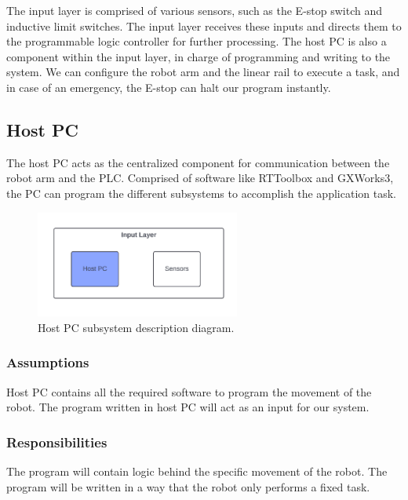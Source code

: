 The input layer is comprised of various sensors, such as the E-stop switch and inductive limit switches. The input layer receives these inputs and directs them to the programmable logic controller for further processing. The host PC is also a component within the input layer, in charge of programming and writing to the system. We can configure the robot arm and the linear rail to execute a task, and in case of an emergency, the E-stop can halt our program instantly.


\subsection{Host PC}
The host PC acts as the centralized component for communication between the robot arm and the PLC. Comprised of software like RTToolbox and GXWorks3, the PC can program the different subsystems to accomplish the application task.

\begin{figure}[h!]
	\centering
 	\includegraphics[width=0.60\textwidth]{images/Input_Host.png}
 \caption{Host PC subsystem description diagram.}
\end{figure}

\subsubsection{Assumptions}
Host PC contains all the required software to program the movement of the robot. The program written in host PC will act as an input for our system. 


\subsubsection{Responsibilities}
The program will contain logic behind the specific movement of the robot. The program will be written in a way that the robot only performs a fixed task.


